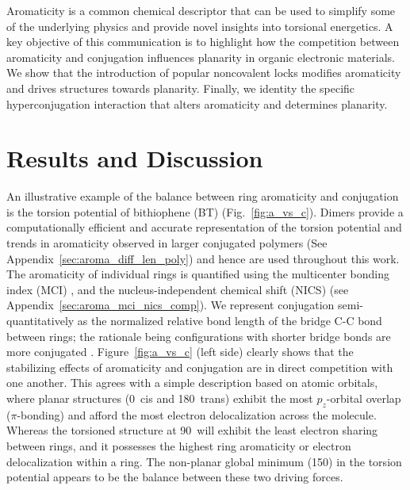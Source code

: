 Aromaticity is a common chemical descriptor that can be used to simplify some of the underlying physics and provide novel insights into torsional energetics. A key objective of this communication is to highlight how the competition between aromaticity and conjugation \cite{Hernandez1994, Kertesz2005, Huang2017} influences planarity in organic electronic materials. We show that the introduction of popular noncovalent locks modifies aromaticity and drives structures towards planarity. Finally, we identity the specific hyperconjugation interaction that alters aromaticity and determines planarity.

\section{Results and Discussion}

An illustrative example of the balance between ring aromaticity and conjugation is the torsion potential of bithiophene (BT) (Fig.~\ref{fig:a_vs_c}). Dimers provide a computationally efficient and accurate representation of the torsion potential and trends in aromaticity observed in larger conjugated polymers (See Appendix~\ref{sec:aroma_diff_len_poly}) \cite{Dubay2012} and hence are used throughout this work. The aromaticity of individual rings is quantified using the multicenter bonding index (MCI) \cite{Giambiagi1990, Giambiagi2000}, and the nucleus-independent chemical shift (NICS) \cite{Fallah-Bagher-Shaidaei2006, Chen2005} (see Appendix~\ref{sec:aroma_mci_nics_comp}). We represent conjugation semi-quantitatively as the normalized relative bond length of the bridge C-C bond between rings; the rationale being configurations with shorter bridge bonds are more conjugated \cite{Daudey1980, Fernandez2006}. Figure~\ref{fig:a_vs_c} (left side) clearly shows that the stabilizing effects of aromaticity and conjugation are in direct competition with one another. This agrees with a simple description based on atomic orbitals, where planar structures (0\textdegree \ cis and 180\textdegree \ trans) exhibit the most $p_z$-orbital overlap ($\pi$-bonding) and afford the most electron delocalization across the molecule. Whereas the torsioned structure at 90\textdegree \ will exhibit the least electron sharing between rings, and it possesses the highest ring aromaticity or electron delocalization within a ring. The non-planar global minimum (150\textdegree) in the torsion potential appears to be the balance between these two driving forces.

